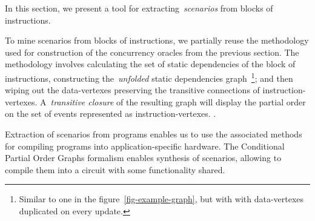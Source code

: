 In this section, we present a tool for extracting~\emph{scenarios} from
blocks of instructions.~

To mine scenarios from blocks of instructions, we partially reuse the methodology
used for construction of the concurrency oracles from the previous section. The methodology
involves calculating the set of static dependencies of the block of instructions,
constructing the~\emph{unfolded} static dependencies graph~\footnote{Similar to one in the
figure~\ref{fig-example-graph}, but with with data-vertexes duplicated on every update.};
and then wiping out the data-vertexes preserving the transitive connections
of instruction-vertexes. A~\emph{transitive closure} of the resulting graph will
display the partial order on the set of events represented as instruction-vertexes.
.

Extraction of scenarios from programs enables us to use the associated methods for
compiling programs into application-specific hardware. The Conditional Partial
Order Graphs formalism enables synthesis of scenarios, allowing to compile them into
a circuit with some functionality shared.

